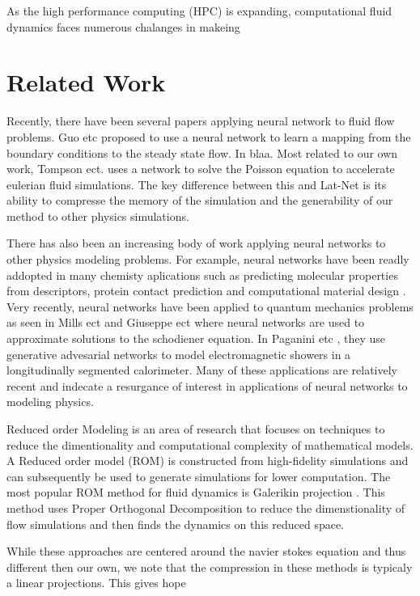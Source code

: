 \documentclass{article}
\begin{document}
As the high performance computing (HPC) is expanding, computational fluid dynamics faces numerous chalanges in makeing 


\section{Related Work}

Recently, there have been several papers applying neural network to fluid flow problems. Guo etc \cite{guo2016convolutional} proposed to use a neural network to learn a mapping from the boundary conditions to the steady state flow. In \cite{yang2016data} blaa. Most related to our own work, Tompson ect. \cite{tompson2016accelerating} uses a network to solve the Poisson equation to accelerate eulerian fluid simulations. The key difference between this and Lat-Net is its ability to compresse the memory of the simulation and the generability of our method to other physics simulations.

There has also been an increasing body of work applying neural networks to other physics modeling problems. For example, neural networks have been readly addopted in many chemisty aplications such as predicting molecular properties from descriptors, protein contact prediction and computational material design \cite{goh2017deep}. Very recently, neural networks have been applied to quantum mechanics problems as seen in Mills ect \cite{mills2017deep} and Giuseppe ect \cite{carleo2017solving} where neural networks are used to approximate solutions to the schodiener equation. In Paganini etc \cite{2017arXiv170502355P}, they use generative advesarial networks \cite{goodfellow2014generative} to model electromagnetic showers in a longitudinally segmented calorimeter. Many of these applications are relatively recent and indecate a resurgance of interest in applications of neural networks to modeling physics.

Reduced order Modeling is an area of research that focuses on techniques to reduce the dimentionality and computational complexity of mathematical models. A Reduced order model (ROM) is constructed from high-fidelity simulations and can subsequently be used to generate simulations for lower computation. The most popular ROM method for fluid dynamics is Galerikin projection \cite{barone2009reduced}. This method uses Proper Orthogonal Decomposition to reduce the dimenstionality of flow simulations and then finds the dynamics on this reduced space. 

While these approaches are centered around the navier stokes equation and thus different then our own, we note that the compression in these methods is typicaly a linear projections. This gives hope 
\end{document}
